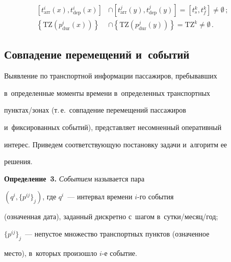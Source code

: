 \begin{itemize}
\begin{align*}
\left [t^i_{\mathrm{arr}}(x), t^i_{\mathrm{dep}}(x) \right]& \cap \left [t^j_{\mathrm{arr}}(y), 


t^j_{\mathrm{dep}}(y) \right] = \left [t^k_s, t^k_f\right] \not= \emptyset\,;


\\


\left \{\mathrm{TZ}\left (p^i_{\mathrm{dur}}(x) \right) \right \} &\cap \left 


\{\mathrm{TZ}\left(p^j_{\mathrm{dur}}(y) \right) \right \}= \mathrm{TZ}^k \not= \emptyset\,.


\end{align*}


\end{itemize}





\subsection{Совпадение перемещений и~событий} %





Выявление по транспортной информации пассажиров, пребывавших 


в~определенные моменты времени в~определенных транспортных 


пунк\-тах\!/\!зо\-нах (т.\,е.\ совпадение перемещений пассажиров 


и~фиксированных событий), пред\-став\-ля\-ет несомненный оперативный 


интерес. Приведем со\-от\-вет\-ст\-ву\-ющую по\-ста\-нов\-ку задачи и~алгоритм ее 


решения.





\smallskip





\textbf{Определение~3.} \textit{Событием} называется пара  


$(q^i, \{p^{ij}\}_j)$, где $q^i$~--- интервал времени $i$-го события 


(означенная дата), заданный дискретно с~шагом в~сут\-ки\!/\!ме\-сяц\!/\!год;  


$\{p^{ij}\}_j$~--- непустое множество транспортных пунктов (означенное 


место), в~которых произошло $i$-е событие.





